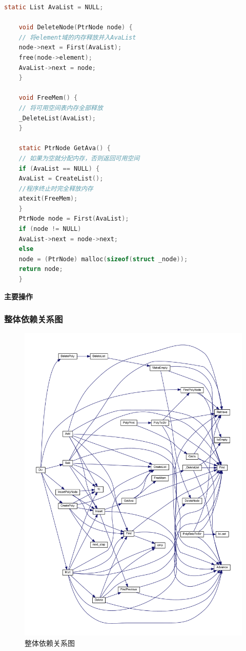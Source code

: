 \begin{lstlisting}[language = c]
    static List AvaList = NULL;

    void DeleteNode(PtrNode node) {
    // 将element域的内存释放并入AvaList
    node->next = First(AvaList);
    free(node->element);
    AvaList->next = node;
    }

    void FreeMem() {
    // 将可用空间表内存全部释放
    _DeleteList(AvaList);
    }

    static PtrNode GetAva() {
    // 如果为空就分配内存，否则返回可用空间
    if (AvaList == NULL) {
    AvaList = CreateList();
    //程序终止时完全释放内存
    atexit(FreeMem);
    }
    PtrNode node = First(AvaList);
    if (node != NULL)
    AvaList->next = node->next;
    else
    node = (PtrNode) malloc(sizeof(struct _node));
    return node;
    }
\end{lstlisting}

\textbf{主要操作}



\subsubsection{整体依赖关系图}

\begin{figure}[H]
    \centering
    \includegraphics[width=0.9\linewidth]{figures/call_graph}
    \caption{整体依赖关系图}
    \label{fig:callgraph}

\end{figure}



